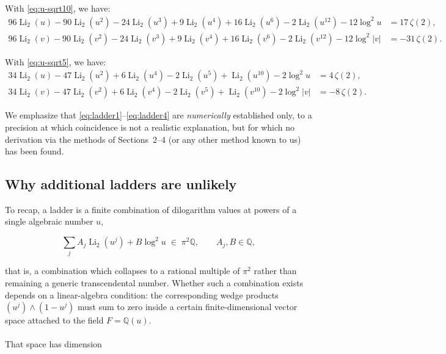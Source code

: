 \documentclass[12pt]{article}
\begin{document}
{\medskip
\noindent With \eqref{eq:u-sqrt10}, we have:
\begin{align}
  96\operatorname{Li}_2(u) - 90\operatorname{Li}_2(u^2)
  - 24\operatorname{Li}_2(u^3) + 9\operatorname{Li}_2(u^4)
  + 16\operatorname{Li}_2(u^6) - 2\operatorname{Li}_2(u^{12})
  - 12\log^2 u &= 17\,\zeta(2), \label{eq:ladder1}\\
  96\operatorname{Li}_2(v) - 90\operatorname{Li}_2(v^2)
  - 24\operatorname{Li}_2(v^3) + 9\operatorname{Li}_2(v^4)
  + 16\operatorname{Li}_2(v^6) - 2\operatorname{Li}_2(v^{12})
  - 12\log^2|v| &= -31\,\zeta(2). \label{eq:ladder2}
\end{align}

\medskip
\noindent With 
\eqref{eq:u-sqrt5}, we have:
\begin{align}
  34\operatorname{Li}_2(u) - 47\operatorname{Li}_2(u^2)
  + 6\operatorname{Li}_2(u^4) - 2\operatorname{Li}_2(u^5)
  + \operatorname{Li}_2(u^{10}) - 2\log^2 u &= 4\,\zeta(2),
  \label{eq:ladder3}\\
  34\operatorname{Li}_2(v) - 47\operatorname{Li}_2(v^2)
  + 6\operatorname{Li}_2(v^4) - 2\operatorname{Li}_2(v^5)
  + \operatorname{Li}_2(v^{10}) - 2\log^2|v| &= -8\,\zeta(2).
  \label{eq:ladder4}
\end{align}



\noindent We emphasize that \eqref{eq:ladder1}--\eqref{eq:ladder4} are
\emph{numerically} established only, to a precision at which
coincidence is not a realistic explanation, but for which no
derivation via the methods of Sections~2--4 (or any other method
known to us) has been found. 


\subsection{Why additional ladders are unlikely}
\label{sec:why-unlikely}

To recap, a ladder is a finite combination of dilogarithm values at powers of a single algebraic number $u$,

\[
  \sum_{j} A_j \operatorname{Li}_2(u^j) + B \log^2 u \;\in\; \pi^2\mathbb{Q}, \qquad A_j, B \in \mathbb{Q},
\]

\noindent that is, a combination which collapses to a rational multiple of $\pi^2$ rather than remaining a generic transcendental number. Whether such a combination exists depends on a linear-algebra condition: the corresponding wedge products $(u^j)\wedge(1-u^j)$ must sum to zero inside a certain finite-dimensional vector space attached to the field $F=\mathbb{Q}(u)$.
\\
\\
\noindent That space has dimension

}
\end{document}
